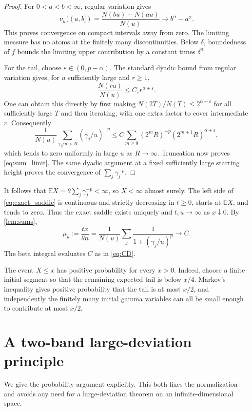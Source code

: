 \documentclass[11pt,letterpaper]{article}
\numberwithin{equation}{section}
\theoremstyle{definition}
\theoremstyle{remark}
\newcommand{\EE}{\mathbb E}
\begin{document}
\begin{proof}
For $0<a<b<\infty$, regular variation gives
\[
 \nu_u((a,b])=\frac{N(bu)-N(au)}{N(u)}\longrightarrow b^\alpha-a^\alpha.
\]
This proves convergence on compact intervals away from zero. The limiting measure has no atoms at the finitely many discontinuities. Below $\delta$, boundedness of $f$ bounds the limiting upper contribution by a constant times $\delta^\alpha$.

For the tail, choose $\varepsilon\in(0,p-\alpha)$. The standard dyadic bound from regular variation gives, for $u$ sufficiently large and $r\ge1$,
\[
 \frac{N(ru)}{N(u)}\le C_\varepsilon r^{\alpha+\varepsilon}.
\]
One can obtain this directly by first making $N(2T)/N(T)\le2^{\alpha+\varepsilon}$ for all sufficiently large $T$ and then iterating, with one extra factor to cover intermediate $r$. Consequently
\[
 \frac1{N(u)}\sum_{\gamma_j/u>R}(\gamma_j/u)^{-p}
 \le C\sum_{m\ge0}(2^mR)^{-p}(2^{m+1}R)^{\alpha+\varepsilon},
\]
which tends to zero uniformly in large $u$ as $R\to\infty$. Truncation now proves \cref{eq:sum_limit}. The same dyadic argument at a fixed sufficiently large starting height proves the convergence of $\sum_j\gamma_j^{-p}$.
\end{proof}

It follows that $\EE X=\theta\sum_j\gamma_j^{-p}<\infty$, so $X<\infty$ almost surely. The left side of \cref{eq:exact_saddle} is continuous and strictly decreasing in $t\ge0$, starts at $\EE X$, and tends to zero. Thus the exact saddle exists uniquely and $t,u\to\infty$ as $x\downarrow0$. By \cref{lem:sums},
\begin{equation}\label{eq:mu_limit}
 \mu_u:=\frac{tx}{\theta n}
 =\frac1{N(u)}\sum_j\frac1{1+(\gamma_j/u)^p}
 \longrightarrow C.
\end{equation}
The beta integral evaluates $C$ as in \cref{eq:CD}.

The event $X\le x$ has positive probability for every $x>0$. Indeed, choose a finite initial segment so that the remaining expected tail is below $x/4$. Markov's inequality gives positive probability that the tail is at most $x/2$, and independently the finitely many initial gamma variables can all be small enough to contribute at most $x/2$.

\section{A two-band large-deviation principle}\label{sec:LDP}

We give the probability argument explicitly. This both fixes the normalization and avoids any need for a large-deviation theorem on an infinite-dimensional space.
\end{document}
